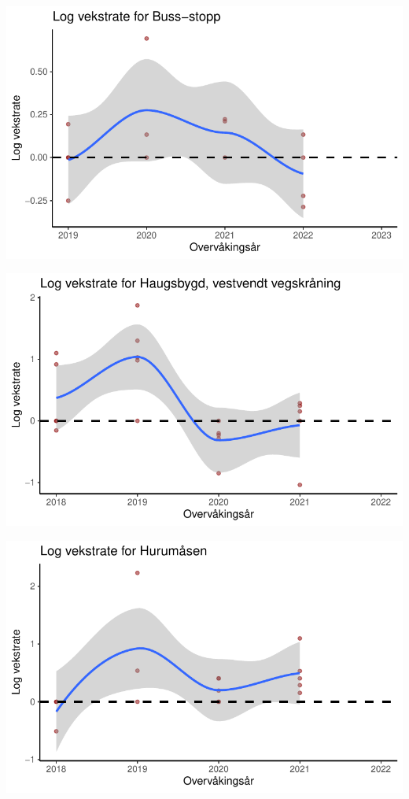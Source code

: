 \documentclass[
  letterpaper,
  DIV=11,
  numbers=noendperiod]{scrreport}
\begin{document}
\includegraphics{growthRate_files/figure-pdf/unnamed-chunk-5-2.pdf}

\includegraphics{growthRate_files/figure-pdf/unnamed-chunk-5-3.pdf}

\includegraphics{growthRate_files/figure-pdf/unnamed-chunk-5-4.pdf}
\end{document}
